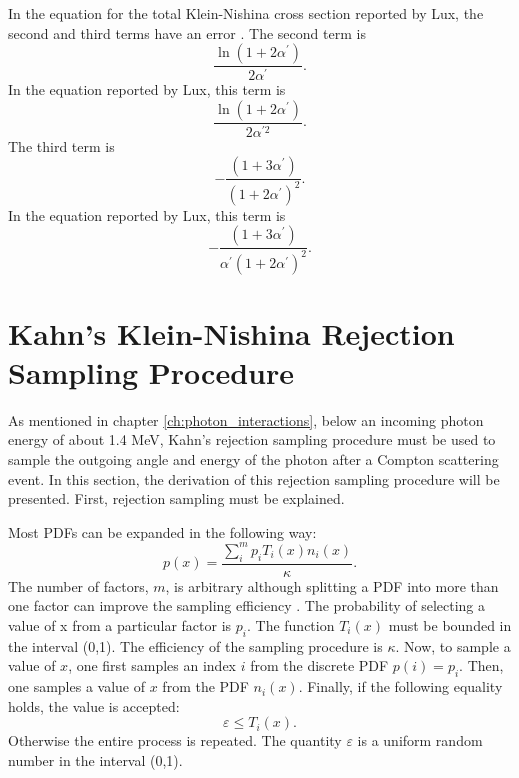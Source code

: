 In the equation for the total Klein-Nishina cross section reported by Lux, the
second and third terms have an error \citep{lux_monte_1991}. The second term is
\begin{equation*}
  \frac{\ln{(1 + 2\alpha^{'})}}{2\alpha^{'}}.
\end{equation*}
In the equation reported by Lux, this term is
\begin{equation*}
  \frac{\ln{(1 + 2\alpha^{'})}}{2\alpha^{'2}}.
\end{equation*}
The third term is 
\begin{equation*}
  -\frac{(1+3\alpha^{'})}{(1+2\alpha^{'})^2}.
\end{equation*}
In the equation reported by Lux, this term is
\begin{equation*}
  -\frac{(1+3\alpha^{'})}{\alpha^{'}(1+2\alpha^{'})^2}.
\end{equation*}

\section{Kahn's Klein-Nishina Rejection Sampling Procedure}
\label{sec:Kahn_rejection_procedure_der}
As mentioned in chapter \ref{ch:photon_interactions}, below an incoming photon
energy of about 1.4 MeV, Kahn's rejection sampling procedure must be used to
sample the outgoing angle and energy of the photon after a Compton scattering
event. In this section, the derivation of this rejection sampling procedure will
be presented. First, rejection sampling must be explained. 

Most PDFs can be expanded in the following way:
\begin{equation}
  p(x) = \frac{\sum_i^m p_i T_i(x)n_i(x)}{\kappa}.
  \label{eq:general_pdf_expansion}
\end{equation}
The number of factors, $m$, is arbitrary although splitting a PDF into more than
one factor can improve the sampling efficiency \citep{kahn_applications_1956}.
The probability of selecting a value of x from a particular factor is $p_i$.
The function $T_i(x)$ must be bounded in the interval (0,1). The efficiency
of the sampling procedure is $\kappa$. Now, to sample a value of $x$, one 
first samples an index $i$ from the discrete PDF $p(i) = p_i$. Then, one 
samples a value of $x$ from the PDF $n_i(x)$. Finally, if the following 
equality holds, the value is accepted: 
\begin{equation*}
  \varepsilon \leq T_i(x).
\end{equation*}
Otherwise the entire process is repeated. The quantity $\varepsilon$ is a 
uniform random number in the interval (0,1).

